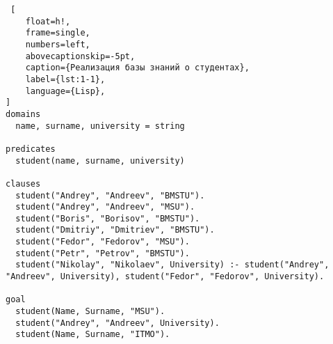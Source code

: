 \begin{lstlisting} [
	float=h!,
	frame=single,
	numbers=left,
	abovecaptionskip=-5pt,
	caption={Реализация базы знаний о студентах},
	label={lst:1-1},
	language={Lisp},
]
domains
  name, surname, university = string
 
predicates
  student(name, surname, university)
  
clauses
  student("Andrey", "Andreev", "BMSTU").
  student("Andrey", "Andreev", "MSU").
  student("Boris", "Borisov", "BMSTU").
  student("Dmitriy", "Dmitriev", "BMSTU").
  student("Fedor", "Fedorov", "MSU").
  student("Petr", "Petrov", "BMSTU").
  student("Nikolay", "Nikolaev", University) :- student("Andrey", "Andreev", University), student("Fedor", "Fedorov", University).
  
goal
  student(Name, Surname, "MSU").
  student("Andrey", "Andreev", University). 
  student(Name, Surname, "ITMO").
\end{lstlisting}